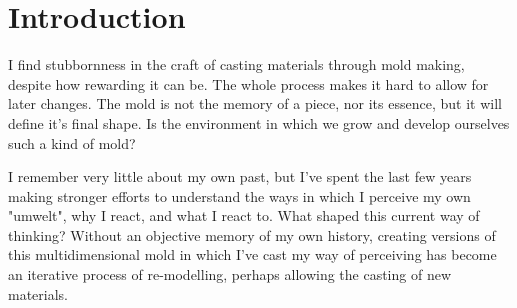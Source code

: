 
\chapter*{Introduction}



I find stubbornness in the craft of casting materials through mold making, despite how rewarding it can be. The whole process makes it hard to allow for later changes. The mold is not the memory of a piece, nor its essence, but it will define it's final shape. Is the environment in which we grow and develop ourselves such a kind of mold? 

I remember very little about my own past, but I’ve spent the last few years making stronger efforts to understand the ways in which I perceive my own "umwelt", why I react, and what I react to. What shaped this current way of thinking? Without an objective memory of my own history, creating versions of this multidimensional mold in which I’ve cast my way of perceiving has become an iterative process of re-modelling, perhaps allowing the casting of new materials.







